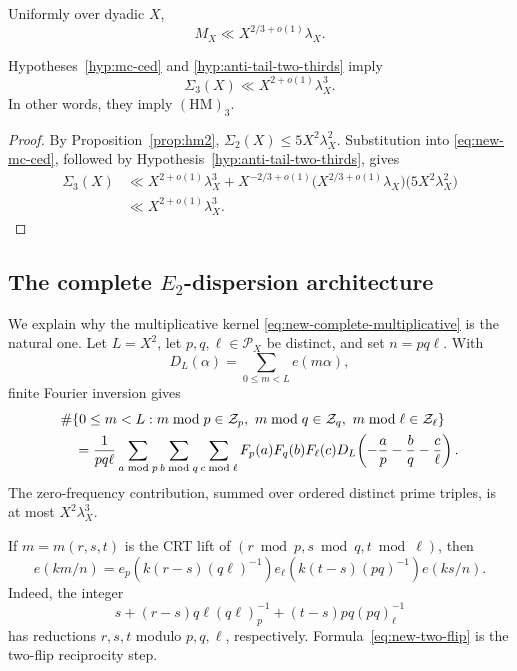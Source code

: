 \begin{hypothesis}
\label{hyp:anti-tail-two-thirds}
Uniformly over dyadic \(X\),
\[
 M_X\ll X^{2/3+o(1)}\lambda_X.
\]
\end{hypothesis}

\begin{theorem}
\label{thm:mc-at-implies-hm3}
Hypotheses~\ref{hyp:mc-ced} and
\ref{hyp:anti-tail-two-thirds} imply
\[
 \Sigma_3(X)\ll X^{2+o(1)}\lambda_X^3.
\]
In other words, they imply \((\mathrm{HM})_3\).
\end{theorem}

\begin{proof}
By Proposition~\ref{prop:hm2},
\(\Sigma_2(X)\le5X^2\lambda_X^2\).  Substitution into
\eqref{eq:new-mc-ced}, followed by
Hypothesis~\ref{hyp:anti-tail-two-thirds}, gives
\begin{align*}
 \Sigma_3(X)
 &\ll X^{2+o(1)}\lambda_X^3
   +X^{-2/3+o(1)}
      \bigl(X^{2/3+o(1)}\lambda_X\bigr)
      \bigl(5X^2\lambda_X^2\bigr)\\
 &\ll X^{2+o(1)}\lambda_X^3.
\end{align*}
\end{proof}

\subsection{The complete \(E_2\)-dispersion architecture}

We explain why the multiplicative kernel
\eqref{eq:new-complete-multiplicative} is the natural one.  Let
\(L=X^2\), let \(p,q,\ell\in\mathcal P_X\) be distinct, and set
\(n=pq\ell\).  With
\[
 D_L(\alpha)=\sum_{0\le m<L}e(m\alpha),
\]
finite Fourier inversion gives
\begin{align}
 &\#\{0\le m<L:
       m\bmod p\in\mathcal Z_p,\
       m\bmod q\in\mathcal Z_q,\
       m\bmod\ell\in\mathcal Z_\ell\}\notag\\
 &\quad=
 \frac1{pq\ell}
 \sum_{a\bmod p}\sum_{b\bmod q}\sum_{c\bmod\ell}
 F_p(a)F_q(b)F_\ell(c)
 D_L\!\left(-\frac ap-\frac bq-\frac c\ell\right).
 \label{eq:new-trilinear-fourier}
\end{align}
The zero-frequency contribution, summed over ordered distinct prime
triples, is at most \(X^2\lambda_X^3\).

If \(m=m(r,s,t)\) is the CRT lift of
\((r\bmod p,s\bmod q,t\bmod\ell)\), then
\begin{equation}
 e(km/n)
 =
 e_p\!\left(k(r-s)(q\ell)^{-1}\right)
 e_\ell\!\left(k(t-s)(pq)^{-1}\right)
 e(ks/n).
 \label{eq:new-two-flip}
\end{equation}
Indeed, the integer
\[
 s+(r-s)q\ell(q\ell)^{-1}_{p}
   +(t-s)pq(pq)^{-1}_{\ell}
\]
has reductions \(r,s,t\) modulo \(p,q,\ell\), respectively.
Formula~\eqref{eq:new-two-flip} is the two-flip reciprocity step.

